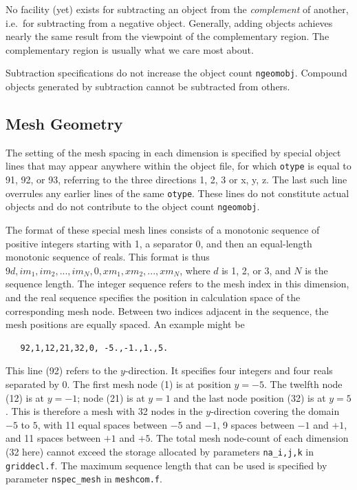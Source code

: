 \documentclass[12pt]{article}
\begin{document}
No facility (yet) exists for subtracting an object from the
\emph{complement} of another, i.e.\ for subtracting from a negative
object. Generally, adding objects achieves nearly the same result from
the viewpoint of the complementary region. The complementary region is
usually what we care most about.

Subtraction specifications do not increase the object count
\verb!ngeomobj!. Compound objects generated by subtraction cannot be
subtracted from others.

\subsection{Mesh Geometry}

The setting of the mesh spacing in each dimension is specified by
special object lines that may appear anywhere within the object file,
for which \verb!otype! is equal to 91, 92, or 93, referring to the
three directions 1, 2, 3 or x, y, z. The last such line overrules any
earlier lines of the same \verb!otype!. These lines do not constitute
actual objects and do not contribute to the object count
\verb!ngeomobj!.

The format of these special mesh lines consists of a monotonic
sequence of positive integers starting with 1, a separator 0, and then
an equal-length monotonic sequence of reals. This format is thus
$9d,im_1,im_2,...,im_N,0,xm_1,xm_2,...,xm_N$, where $d$ is 1, 2, or 3,
and $N$ is the sequence length. The integer sequence refers to the
mesh index in this dimension, and the real sequence specifies the
position in calculation space of the corresponding mesh node. Between
two indices adjacent in the sequence, the mesh positions are equally
spaced. An example might be
\begin{verbatim}
   92,1,12,21,32,0, -5.,-1.,1.,5.
\end{verbatim}
This line (92) refers to the $y$-direction. It specifies four integers
and four reals separated by 0. The first mesh node (1) is at position
$y=-5$. The twelfth node (12) is at $y=-1$; node (21) is at $y=1$ and the
last node position (32) is at $y=5$. This is therefore a mesh with 32
nodes in the $y$-direction covering the domain $-5$ to $5$, with 11
equal spaces between $-5$ and $-1$, 9 spaces between $-1$ and $+1$,
and 11 spaces between $+1$ and $+5$. The total mesh node-count of each
dimension (32 here) cannot exceed the storage allocated by parameters
\verb!na_i,j,k! in \verb!griddecl.f!. The maximum sequence length that
can be used is specified by parameter \verb!nspec_mesh! in
\verb!meshcom.f!.
\end{document}
